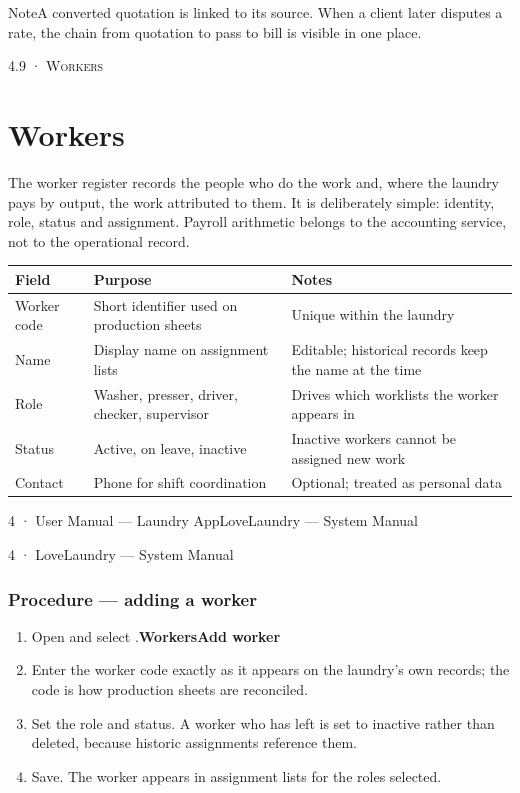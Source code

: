 \documentclass[11pt,a4paper,oneside]{book}
\begin{document}
\begin{notebox}NoteA converted quotation is linked to its source. When a client later disputes a rate, the chain from quotation to pass to bill is visible in one place.\end{notebox}
\textsc{\small\color{crimson}4.9 · Workers}\par\medskip
\section*{Workers}
The worker register records the people who do the work and, where the laundry pays by output, the work attributed to them. It is deliberately simple: identity, role, status and assignment. Payroll arithmetic belongs to the accounting service, not to the operational record.

\begin{center}\small
\begin{tabularx}{\linewidth}{|X|X|X|}
\hline
\rowcolor{lightgrey}
\textbf{Field} & \textbf{Purpose} & \textbf{Notes} \\ \hline
Worker code & Short identifier used on production sheets & Unique within the laundry \\ \hline
Name & Display name on assignment lists & Editable; historical records keep the name at the time \\ \hline
Role & Washer, presser, driver, checker, supervisor & Drives which worklists the worker appears in \\ \hline
Status & Active, on leave, inactive & Inactive workers cannot be assigned new work \\ \hline
Contact & Phone for shift coordination & Optional; treated as personal data \\ \hline
\end{tabularx}
\end{center}
4 · User Manual — Laundry AppLoveLaundry — System Manual

4 · LoveLaundry — System Manual

\subsubsection*{Procedure — adding a worker}
\begin{enumerate}
\item Open  and select .\textbf{Workers}\textbf{Add worker}
\item Enter the worker code exactly as it appears on the laundry's own records; the code is how production sheets are reconciled.
\item Set the role and status. A worker who has left is set to inactive rather than deleted, because historic assignments reference them.
\item Save. The worker appears in assignment lists for the roles selected.
\end{enumerate}
\end{document}
